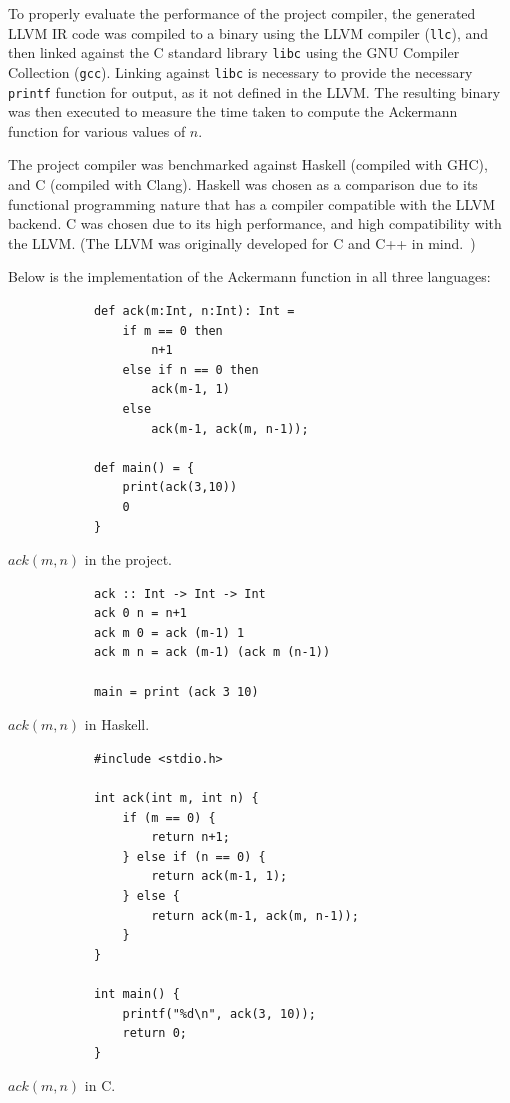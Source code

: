 To properly evaluate the performance of the project compiler, the generated LLVM IR code was
compiled to a binary using the LLVM compiler (\texttt{llc}), and then linked against the C standard
library \texttt{libc} using the GNU Compiler Collection (\texttt{gcc}). Linking against
\texttt{libc} is necessary to provide the necessary \texttt{printf} function for output, as it not
defined in the LLVM. The resulting binary was then executed to measure the time taken to compute the
Ackermann function for various values of $n$.

The project compiler was benchmarked against Haskell (compiled with GHC), and C (compiled with
Clang). Haskell was chosen as a comparison due to its functional programming nature that has a
compiler compatible with the LLVM backend. C was chosen due to its high performance, and high
compatibility with the LLVM. (The LLVM was originally developed for C and C++ in
mind.~\autocite{lattner2004llvm})

Below is the implementation of the Ackermann function in all three languages:

\vspace{0.3cm}
\begin{tcbitemize}[raster columns=3, raster equal height=rows,size=small,space to upper]
    \tcbitem
        \footnotesize
        \begin{verbatim}
            def ack(m:Int, n:Int): Int =
                if m == 0 then
                    n+1
                else if n == 0 then
                    ack(m-1, 1)
                else
                    ack(m-1, ack(m, n-1));

            def main() = {
                print(ack(3,10))
                0
            }
        \end{verbatim}
        \tcblower
        \footnotesize $ack(m, n)$ in the project.
    \tcbitem
        \footnotesize
        \begin{verbatim}
            ack :: Int -> Int -> Int
            ack 0 n = n+1
            ack m 0 = ack (m-1) 1
            ack m n = ack (m-1) (ack m (n-1))

            main = print (ack 3 10)
        \end{verbatim}
        \vfill
        \tcblower
        \footnotesize $ack(m, n)$ in Haskell.
    \tcbitem
        \scriptsize
        \begin{verbatim}
            #include <stdio.h>

            int ack(int m, int n) {
                if (m == 0) {
                    return n+1;
                } else if (n == 0) {
                    return ack(m-1, 1);
                } else {
                    return ack(m-1, ack(m, n-1));
                }
            }

            int main() {
                printf("%d\n", ack(3, 10));
                return 0;
            }
        \end{verbatim}
        \tcblower
        \footnotesize $ack(m, n)$ in C.
\end{tcbitemize}
\vspace{0.4cm}

